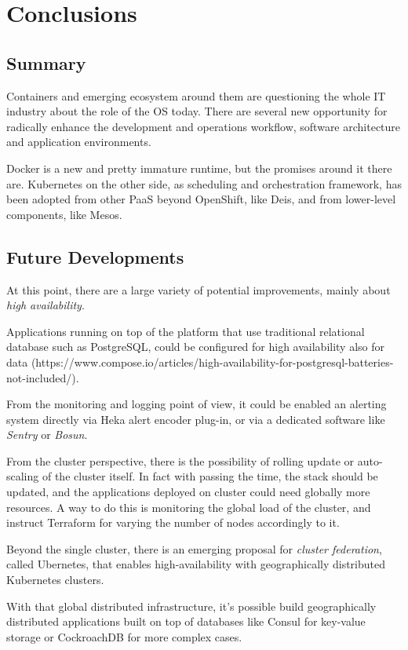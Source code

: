 \chapter{Conclusions}\label{conclusions}

\section{Summary}\label{summary}

Containers and emerging ecosystem around them are questioning the whole
IT industry about the role of the OS today. There are several new
opportunity for radically enhance the development and operations
workflow, software architecture and application environments.

Docker is a new and pretty immature runtime, but the promises around it
there are. Kubernetes on the other side, as scheduling and orchestration
framework, has been adopted from other PaaS beyond OpenShift, like Deis,
and from lower-level components, like Mesos.

\section{Future Developments}\label{future-developments}

At this point, there are a large variety of potential improvements, mainly about \textit{high availability}\cite{HighAvailability}.

Applications running on top of the platform that use traditional
relational database such as PostgreSQL, could be configured for high
availability also for data
(https://www.compose.io/articles/high-availability-for-postgresql-batteries-not-included/).

From the monitoring and logging point of view, it could be enabled an
alerting system directly via Heka alert encoder plug-in, or via a
dedicated software like \textit{Sentry} or \textit{Bosun}.

From the cluster perspective, there is the possibility of rolling update
or auto-scaling of the cluster itself. In fact with passing the time,
the stack should be updated, and the applications deployed on cluster
could need globally more resources. A way to do this is monitoring the
global load of the cluster, and instruct Terraform for varying the number
of nodes accordingly to it.

Beyond the single cluster, there is an emerging proposal for
\textit{cluster federation}, called Ubernetes, that enables
high-availability with geographically distributed Kubernetes clusters.

With that global distributed infrastructure, it's possible build
geographically distributed applications built on top of databases like
Consul for key-value storage or CockroachDB for more complex cases.